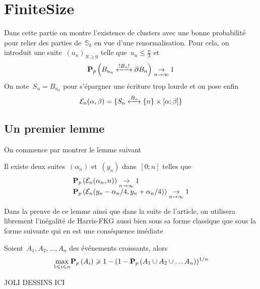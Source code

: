 \section{FiniteSize}
	Dans cette partie on montre l'existence de clusters avec une bonne probabilité pour relier des parties de~$\mathbb{S}_k$ en vue d'une renormalisation. Pour cela, on introduit une suite~$(u_n)_{N \geqslant0}$ telle que~$u_n \leqslant \frac{n}{3}$ et 
	\[
		\Pp{\relie*[B_n]{B_{u_n}}{\partial B_n}} \underset{n \to \infty}{\to} 1
	\] 
	On note~$S_n = B_{u_n}$ pour s'épargner une écriture trop lourde et on pose enfin
	\[
		\mathcal{E}_n( \alpha, \beta ) = \{\relie[B_n]{S_n}{\{n\} \times [ \alpha ; \beta ]} \}
	\]
	\subsection{Un premier lemme}
		On commence par montrer le lemme suivant
		\begin{lem}\label{lem:collagesElem}
			Il existe deux suites~$(\alpha_n)$ et~$(y_n)$ dans~$[0; n]$ telles que
			\[
				\begin{array}{l}
					\bm{\mathrm{P}}_{p}\left(\mathcal{E}_n(\alpha_n, n)\right) \underset{n \to \infty}{\to} 1 \\
					\bm{\mathrm{P}}_{p}\left(\mathcal{E}_n(y_n - \alpha_n/4, y_n + \alpha_n/4)\right) \underset{n \to \infty}{\to} 1
				\end{array}
			\]
		\end{lem}
		Dans la preuve de ce lemme ainsi que dans la suite de l'article, on utilisera librement l'inégalité de Harris-FKG aussi bien sous sa forme classique que sous la forme suivante qui en est une conséquence imédiate
		\begin{lem}\label{lem:HarrisFKG}
			Soient~$A_1, A_2, \ldots, A_n$ des événements croissants, alors
			\[
				\underset{1 \leqslant i \leqslant n}{\max} \bm{\mathrm{P}}_{p}\left(A_i\right) \geqslant 1 - (1 - \bm{\mathrm{P}}_{p}\left(A_1 \cup A_2 \cup \ldots A_n\right))^{1/n}
			\]
		\end{lem}
		
		JOLI DESSINS ICI

